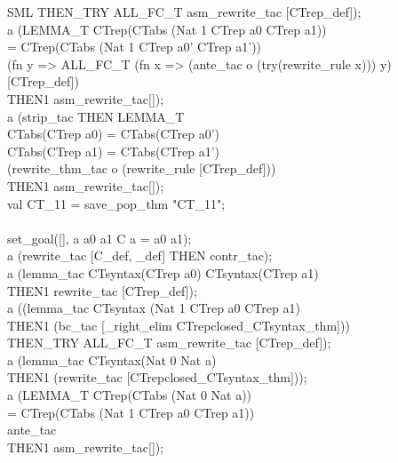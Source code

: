 {\begin{GFT}{SML}
\+		THEN\_TRY ALL\_FC\_T asm\_rewrite\_tac [CTrep\_def]);\\
\+a (LEMMA\_T \PrKM{}CTrep(CTabs (Nat 1 \MMM{\mapsto} CTrep a0 \MMM{\mapsto} CTrep a1))\\
\+             = CTrep(CTabs (Nat 1 \MMM{\mapsto} CTrep a0' \MMM{\mapsto} CTrep a1'))\PrKO{}\\
\+	(fn y => ALL\_FC\_T (fn x => (ante\_tac o (try(rewrite\_rule x))) y) [CTrep\_def])\\
\+	THEN1 asm\_rewrite\_tac[]);\\
\+a (strip\_tac THEN LEMMA\_T\\
\+	\PrKM{}CTabs(CTrep a0) = CTabs(CTrep a0')\\
\+	\MMM{\land} CTabs(CTrep a1) = CTabs(CTrep a1')\PrKO{}\\
\+	(rewrite\_thm\_tac o (rewrite\_rule [CTrep\_def]))\\
\+	THEN1 asm\_rewrite\_tac[]);\\
\+val CT\_11 = save\_pop\_thm "CT\_11";\\
\+\\
\+set\_goal([], \PrKM{}\MMM{\forall}a a0 a1\MMM{\bullet} \MMM{\lnot} C a = a0  a1\PrKO{});\\
\+a (rewrite\_tac [C\_def, \_def] THEN contr\_tac);\\
\+a (lemma\_tac \PrKM{}CTsyntax(CTrep a0) \MMM{\land} CTsyntax(CTrep a1)\PrKO{}\\
\+	THEN1 rewrite\_tac [CTrep\_def]);\\
\+a ((lemma\_tac \PrKM{}CTsyntax (Nat 1 \MMM{\mapsto} CTrep a0 \MMM{\mapsto} CTrep a1)\PrKO{}\\
\+	THEN1 (bc\_tac [\MMM{\land}\_right\_elim CTrepclosed\_CTsyntax\_thm]))\\
\+		THEN\_TRY ALL\_FC\_T asm\_rewrite\_tac [CTrep\_def]);\\
\+a (lemma\_tac \PrKM{}CTsyntax(Nat 0 \MMM{\mapsto} Nat a)\PrKO{}\\
\+	THEN1 (rewrite\_tac [CTrepclosed\_CTsyntax\_thm]));\\
\+a (LEMMA\_T \PrKM{}CTrep(CTabs (Nat 0 \MMM{\mapsto} Nat a))\\
\+	= CTrep(CTabs (Nat 1 \MMM{\mapsto} CTrep a0 \MMM{\mapsto} CTrep a1))\PrKO{}\\
\+	ante\_tac\\
\+	THEN1 asm\_rewrite\_tac[]);\\

\end{GFT}}
